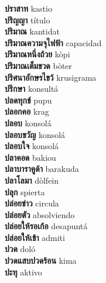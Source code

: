 \textbf{ ปราสาท  } kastio \\
\textbf{ ปริญญา  } título \\
\textbf{ ปริมาณ  } kantidat \\
\textbf{ ปริมาณความจุไฟฟ้า  } capacidad \\
\textbf{ ปริมาณหนึ่งถ้วย  } kòpi \\
\textbf{ ปริมาณเต็มขวด  } bòter \\
\textbf{ ปริศนาอักษรไขว้  } krusigrama \\
\textbf{ ปรึกษา  } konsultá \\
\textbf{ ปลดทุกข์  } pupu \\
\textbf{ ปลอกคอ  } krag \\
\textbf{ ปลอบ  } konsolá \\
\textbf{ ปลอบขวัญ  } konsolá \\
\textbf{ ปลอบใจ  } konsolá \\
\textbf{ ปลาคอด  } bakiou \\
\textbf{ ปลาบาราคูด้า  } barakuda \\
\textbf{ ปลาโลมา  } dòlfein \\
\textbf{ ปลุก  } spierta \\
\textbf{ ปล่อยข่าว  } circula \\
\textbf{ ปล่อยตัว  } absolviendo \\
\textbf{ ปล่อยให้รอเก้อ  } desapuntá \\
\textbf{ ปล่อยให้เข้า  } admiti \\
\textbf{ ปวด  } doló \\
\textbf{ ปวดแสบปวดร้อน  } kima \\
\textbf{ ปะทุ  } aktivo \\
